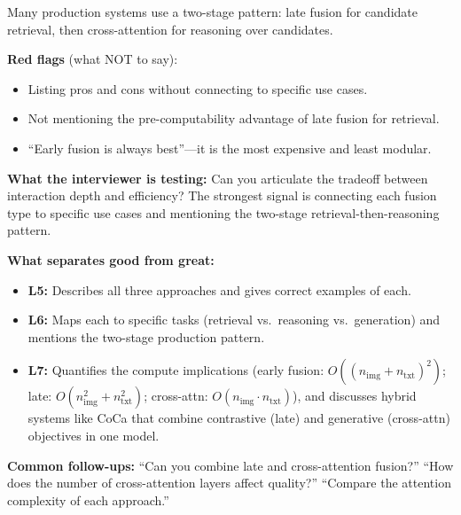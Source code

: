 \begin{interviewq}
Many production systems use a two-stage pattern: late fusion for candidate retrieval, then cross-attention for reasoning over candidates.

\textbf{Red flags} (what NOT to say):
\begin{itemize}
    \item Listing pros and cons without connecting to specific use cases.
    \item Not mentioning the pre-computability advantage of late fusion for retrieval.
    \item ``Early fusion is always best''---it is the most expensive and least modular.
\end{itemize}

\textbf{What the interviewer is testing:} Can you articulate the tradeoff between interaction depth and efficiency? The strongest signal is connecting each fusion type to specific use cases and mentioning the two-stage retrieval-then-reasoning pattern.

\textbf{What separates good from great:}
\begin{itemize}
    \item \textbf{L5:} Describes all three approaches and gives correct examples of each.
    \item \textbf{L6:} Maps each to specific tasks (retrieval vs.\ reasoning vs.\ generation) and mentions the two-stage production pattern.
    \item \textbf{L7:} Quantifies the compute implications (early fusion: $O((n_{\text{img}} + n_{\text{txt}})^2)$; late: $O(n_{\text{img}}^2 + n_{\text{txt}}^2)$; cross-attn: $O(n_{\text{img}} \cdot n_{\text{txt}})$), and discusses hybrid systems like CoCa that combine contrastive (late) and generative (cross-attn) objectives in one model.
\end{itemize}

\textbf{Common follow-ups:} ``Can you combine late and cross-attention fusion?'' ``How does the number of cross-attention layers affect quality?'' ``Compare the attention complexity of each approach.''
\end{interviewq}


